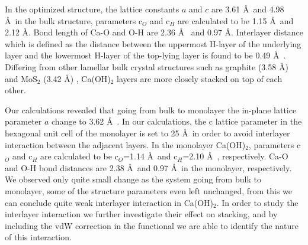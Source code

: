 In the optimized structure, the lattice constants $a$ and $c$ are 3.61 \AA~and 4.98 \AA~in the bulk structure, parameters c$_O$ and c$_H$ are calculated to be 1.15 \AA~and 2.12 \AA . Bond length of Ca-O and O-H are 2.36 \AA~ and 0.97 \AA . Interlayer distance which is defined as the distance between the uppermost H-layer of the underlying layer and the lowermost H-layer  of the top-lying layer is found to be 0.49 \AA~. Differing from other lamellar bulk crystal structures such as graphite (3.58 \AA) and MoS$_{2}$ (3.42 \AA)\cite{can} , Ca(OH)$_{2}$ layers are more closely stacked on top of each other. 

Our calculations revealed that going from bulk to monolayer the in-plane lattice parameter $a$ change to 3.62 \AA~. In our calculations, the c lattice parameter in the hexagonal unit cell of the monolayer is set to 25 \AA~in order to avoid interlayer interaction between the adjacent layers. In the monolayer Ca(OH)$_2$, parameters c$_O$ and c$_H$ are calculated to be c$_O$=1.14 \AA~and c$_{H}$=2.10 \AA~, respectively. Ca-O and O-H bond distances are 2.38 \AA~and 0.97 \AA~in the monolayer, respectively. We observed only quite small change as the system going from bulk to monolayer, some of the structure parameters even left unchanged, from this we can conclude quite weak interlayer interaction in Ca(OH)$_2$. In order to study the interlayer interaction we further investigate their effect on stacking, and by including the vdW correction in the functional we are able to identify the nature of this interaction.


